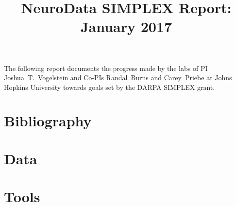 \documentclass[12pt]{article}
\title{NeuroData SIMPLEX Report: January 2017}
\begin{document}
\renewcommand{\onlyinsubfile}[1]{}
\renewcommand{\notinsubfile}[1]{#1}
\maketitle
\thispagestyle{empty}

The following report documents the progress made by the labs of PI Joshua~T.~Vogelstein and Co-PIs Randal~Burns and Carey~Priebe at Johns Hopkins University towards goals set by the DARPA SIMPLEX grant.

\setcounter{tocdepth}{2}
\tableofcontents


\newpage 
\section{Bibliography}
\begin{spacing}{0.5}
{\footnotesize
{}
 
 
}
\end{spacing}

\newpage 
\section{Data}

%


\newpage
\section{Tools}

%



\clearpage

\clearpage

\clearpage


















\newpage
\begin{spacing}{0.5}
{\footnotesize
}
\end{spacing}

\end{document}
